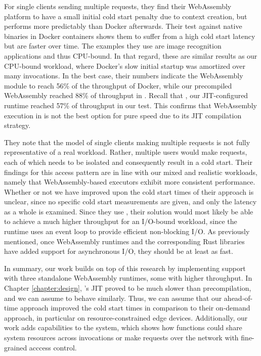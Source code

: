 For single clients sending multiple requests, they find their WebAssembly platform to have a small initial cold start penalty due to context creation, but performs more predictably than Docker afterwards. Their test against native binaries in Docker containers shows them to suffer from a high cold start latency but are faster over time. The examples they use are image recognition applications and thus CPU-bound. In that regard, these are similar results as our CPU-bound workload, where Docker's slow initial startup was amortized over many invocations.
In the best case, their numbers indicate the WebAssembly module to reach 56\% of the throughput of Docker, while our precompiled WebAssembly reached 88\% of throughput in . Recall that , our JIT-configured runtime reached 57\% of throughput in our test. This confirms that WebAssembly execution in  is not the best option for pure speed due to its JIT compilation strategy.

They note that the model of single clients making multiple requests is not fully representative of a real workload. Rather, multiple users would make requests, each of which needs to be isolated and consequently result in a cold start. Their findings for this access pattern are in line with our mixed and realistic workloads, namely that WebAssembly-based executors exhibit more consistent performance. Whether or not we have improved upon the cold start times of their approach is unclear, since no specific cold start measurements are given, and only the latency as a whole is examined. 
Since they use , their solution would most likely be able to achieve a much higher throughput for an I/O-bound workload, since the runtime uses an event loop to provide efficient non-blocking I/O. As previously mentioned, once WebAssembly runtimes and the corresponding Rust libraries have added support for asynchronous I/O, they should be at least as fast.

In summary, our work builds on top of this research by implementing support with three standalone WebAssembly runtimes, some with higher throughput. In Chapter \ref{chapter:design}, 's JIT proved to be much slower than precompilation, and we can assume  to behave similarly. Thus, we can assume that our ahead-of-time approach improved the cold start times in comparison to their on-demand approach, in particular on resource-constrained edge devices. Additionally, our work adds capabilities to the system, which shows how functions could share system resources across invocations or make requests over the network with fine-grained acccess control.
